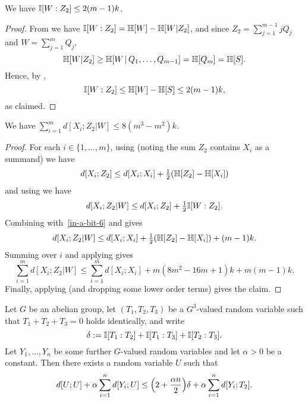 \begin{lemma}\label{mutual-w-z2}  We have  $\mathbb{I}[W : Z_2] \leq 2 (m-1) k$.
\end{lemma}

\begin{proof}
  From  we have $\mathbb{I}[W : Z_2] = \mathbb{H}[W] - \mathbb{H}[W | Z_2]$, and since $Z_2 = \sum_{j=1}^{m-1} j Q_j$ and $W = \sum_{j=1}^m Q_j$,
  \[
    \mathbb{H}[W | Z_2] \geq \mathbb{H}[W \,|\, Q_1,\dots,Q_{m-1}] = \mathbb{H}[Q_m] = \mathbb{H}[S].
  \]
  Hence, by ,
  \[
    \mathbb{I}[W : Z_2] \leq \mathbb{H}[W] - \mathbb{H}[S] \leq 2 (m-1) k,
  \]
  as claimed.
\end{proof}

\begin{lemma}\label{xi-z2-w-dist} We have $\sum_{i=1}^m d[X_i;Z_2|W] \leq 8(m^3-m^2) k$.
\end{lemma}

\begin{proof}
  For each $i \in \{1,\dots, m\}$, using  (noting the sum $Z_2$ contains $X_i$ as a summand) we have
  \begin{equation}\label{in-a-bit-6}
    d[X_i;Z_2] \leq d[X_i;X_i] + \tfrac12 (\mathbb{H}[Z_2] - \mathbb{H}[X_i])
  \end{equation}
  and using  we have
  \[
    d[X_i;Z_2 | W] \leq d[X_i;Z_2] + \tfrac12 \mathbb{I}[W : Z_2].
  \]
 Combining with~\eqref{in-a-bit-6} and  gives
 \[ d[X_i;Z_2 | W] \leq d[X_i;X_i] + \tfrac12 (\mathbb{H}[Z_2] - \mathbb{H}[X_i]) + (m-1)k.\]
 Summing over $i$ and applying  gives
 \[ \sum_{i = 1}^m d[X_i;Z_2 | W] \leq \sum_{i = 1}^m d[X_i;X_i] + m(8m^2-16m+1) k + m(m-1) k.\]
Finally, applying  (and dropping some lower order terms) gives the claim.
\end{proof}

\begin{lemma}
  \label{lem:get-better}
  Let $G$ be an abelian group, let $(T_1,T_2,T_3)$ be a $G^3$-valued random variable such that $T_1+T_2+T_3=0$ holds identically, and write
  \[
    \delta := \mathbb{I}[T_1 : T_2] + \mathbb{I}[T_1 : T_3] + \mathbb{I}[T_2 : T_3].
  \]
  Let $Y_1,\dots,Y_n$ be some further $G$-valued random variables and let $\alpha>0$ be a constant.
  Then there exists a random variable $U$ such that
  \begin{equation}
    \label{eq:get-better}
    d[U;U] + \alpha \sum_{i=1}^n d[Y_i;U] \leq \Bigl(2 + \frac{\alpha n}{2} \Bigr) \delta + \alpha \sum_{i=1}^n d[Y_i;T_2].
  \end{equation}
\end{lemma}

